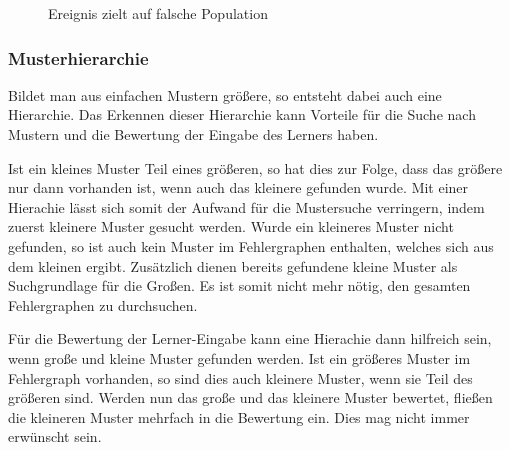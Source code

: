 
\begin{figure}[htb]
\centering
{}
\caption{Ereignis zielt auf falsche Population}
\label{pic:bspFalschePopulation}
\end{figure}

\subsubsection{Musterhierarchie}
Bildet man aus einfachen Mustern größere, so entsteht dabei auch eine Hierarchie. Das 
Erkennen dieser Hierarchie kann Vorteile für die Suche nach Mustern und die Bewertung der 
Eingabe des Lerners haben.

Ist ein kleines Muster Teil eines größeren, so hat dies zur Folge, dass das größere 
nur dann vorhanden ist, wenn auch das kleinere gefunden wurde. Mit einer Hierachie 
lässt sich somit der Aufwand für die Mustersuche verringern, indem zuerst kleinere Muster 
gesucht werden. Wurde ein kleineres Muster nicht gefunden, so ist auch kein Muster im 
Fehlergraphen enthalten, welches sich aus dem kleinen ergibt. Zusätzlich dienen bereits 
gefundene kleine Muster als Suchgrundlage für die Großen. Es ist somit nicht mehr nötig, 
den gesamten Fehlergraphen zu durchsuchen.

Für die Bewertung der Lerner-Eingabe kann eine Hierachie dann hilfreich sein, wenn große und 
kleine Muster gefunden werden. Ist ein größeres Muster im Fehlergraph vorhanden, so sind 
dies auch kleinere Muster, wenn sie Teil des größeren sind. Werden nun das große und das 
kleinere Muster bewertet, fließen die kleineren Muster mehrfach in die Bewertung ein. Dies 
mag nicht immer erwünscht sein.


